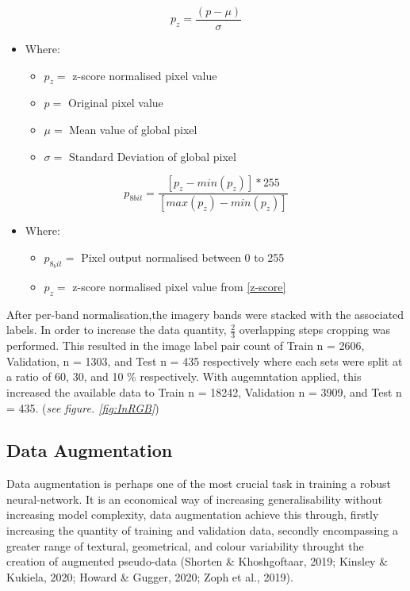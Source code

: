 \documentclass[11pt, a4paper, twoside]{report}
\begin{document}
\begin{equation}
  \label{z-score}
  p_{z} = \frac{(p - \mu)}{\sigma}
\end{equation}

\begin{itemize}
  \item Where:
    \begin{itemize}
      \item $p_{z} =$ z-score normalised pixel value
      \item $p =$ Original pixel value
      \item $\mu =$ Mean value of global pixel
      \item $\sigma =$ Standard Deviation of global pixel
    \end{itemize}
\end{itemize}

\begin{equation}
  \label{png_norm}
  p_{8 bit} = \frac{[p_{z} - min(p_{z})] * 255}{[max(p_{z}) - min(p_{z})]}
\end{equation}

\begin{itemize}
  \item Where:
    \begin{itemize}
      \item $p_{8_bit} =$ Pixel output normalised between 0 to 255
      \item $p_{z} =$ z-score normalised pixel value from \ref{z-score}
    \end{itemize}
\end{itemize}

After per-band normalisation,the imagery bands were stacked with the associated labels. In order to increase the data quantity, $\frac{2}{3}$ overlapping steps cropping was performed. This resulted in the image label pair count of Train n = 2606, Validation, n = 1303, and Test n = 435 respectively where each sets were split at a ratio of 60, 30, and 10 \% respectively. With augemntation applied, this increased the available data to Train n = 18242, Validation n = 3909, and Test n = 435. (\textit{see figure. \ref{fig:InRGB}})

\subsection{Data Augmentation}\label{DataAug}

Data augmentation is perhaps one of the most crucial task in training a robust neural-network. It is an economical way of increasing generalisability without increasing model complexity, data augmentation achieve this through, firstly increasing the quantity of training and validation data, secondly encompassing a greater range of textural, geometrical, and colour variability throught the creation of augmented pseudo-data (Shorten \& Khoshgoftaar, 2019; Kinsley \& Kukiela, 2020; Howard \& Gugger, 2020; Zoph et al., 2019).\\\par
\end{document}
